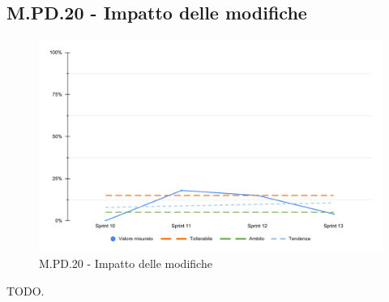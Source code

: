 \subsection{M.PD.20 - Impatto delle modifiche}

\begin{figure}[H]
  \centering
  \includegraphics[width=\textwidth]{assets/impatto_modifiche.pdf}
  \caption{M.PD.20 - Impatto delle modifiche}
\end{figure}

\par TODO.